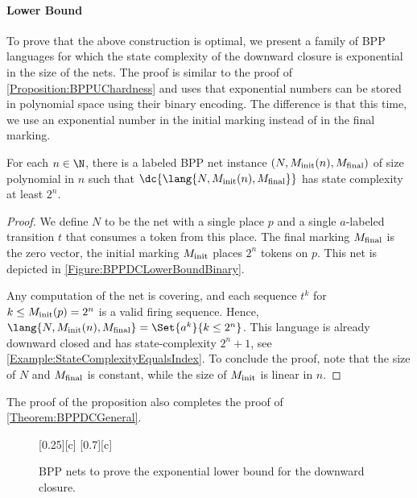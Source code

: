 \documentclass[../../diss.tex]{subfiles}
\begin{document}
\paragraph{Lower Bound}

To prove that the above construction is optimal, we present a family of BPP languages for which the state complexity of the downward closure is exponential in the size of the nets.
The proof is similar to the proof of \cref{Proposition:BPPUChardness} and uses that exponential numbers can be stored in polynomial space using their binary encoding.
The difference is that this time, we use an exponential number in the initial marking instead of in the final marking.

\begin{proposition}%
\label{Propositition:BPPDCHardness}%
    For each $n \in \N$, there is a labeled BPP net instance $(N, M_{\text{init}}(n), M_{\text{final}})$ of size polynomial in $n$ such that $\dc{\lang{N, \Minit(n), \Mfinal}}$ has state complexity at least $2^n$.
\end{proposition}

\begin{proof}
    We define $N$ to be the net with a single place $p$ and a single $a$-labeled transition $t$ that consumes a token from this place.
    The final marking $M_{\text{final}}$ is the zero vector, the initial marking $M_{\text{init}}$ places $2^n$ tokens on $p$.
    This net is depicted in \cref{Figure:BPPDCLowerBoundBinary}.

    Any computation of the net is covering, and each sequence $t^k$ for $k \leq M_{\text{init}}(p) = 2^n$ is a valid firing sequence.
    Hence, $\lang{N, \Minit(n), \Mfinal} = \Set{ a^k }{ k \leq 2^n}$.
    This language is already downward closed and has state-complexity $2^n + 1$, see \cref{Example:StateComplexityEqualsIndex}.
    To conclude the proof, note that the size of $N$ and $M_{\text{final}}$ is constant, while the size of $M_{\text{init}}$ is linear in $n$.
\end{proof}

The proof of the proposition also completes the proof of \cref{Theorem:BPPDCGeneral}.

\begin{figure}[t]
    {\centering{}[0.25\textwidth][c]{
        }
    }
    {\centering{}[0.7\textwidth][c]{
        }
    }
    \caption{BPP nets to prove the exponential lower bound for the downward closure.}%
    \label{Figure:BPPDCLowerBound}%
\end{figure}
\end{document}
